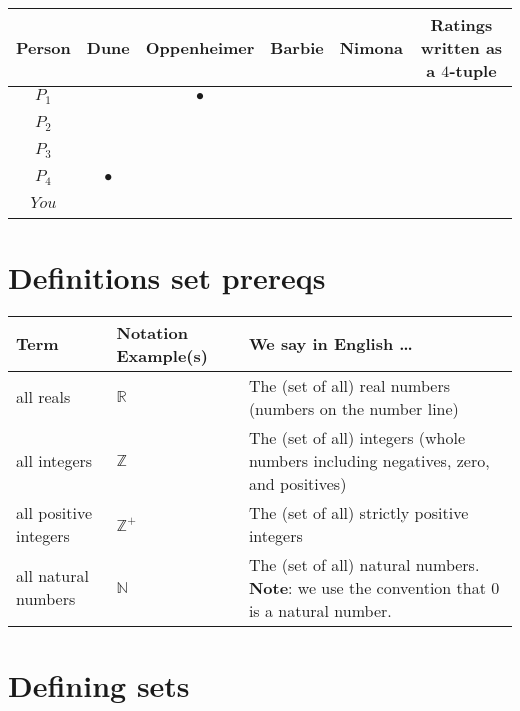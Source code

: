 \documentclass[12pt, oneside]{article}
\newcommand{\cmark}{\ding{51}}
\newcommand{\xmark}{\ding{55}}
\begin{document}
\vfill

\begin{center}
\begin{tabular}{c|cccc||c}
Person & Dune & Oppenheimer & Barbie & Nimona & Ratings written as a $4$-tuple\\
\hline
$P_1$     & \xmark & $\bullet$ & \cmark & \phantom{$(-1, 0, 1, 1)$} \\
&&&& \\
$P_2$     & \cmark & \cmark & \xmark & \phantom{$(1, 1, -1, 1)$} \\
&&&& \\
$P_3$     & \cmark & \cmark & \cmark & \phantom{$(1, 1, 1, 1)$} \\
&&&& \\
$P_4$     & $\bullet$ & \xmark & \cmark &  \\
&&&& \\
$You$     &  &  &  &  \\
&&&& \\
\end{tabular}
\end{center} \vfill
\section*{Definitions set prereqs}


\begin{center}
\begin{tabular}{|llp{9.8cm}|}
\hline
{\bf Term} & {\bf Notation Example(s)} & {\bf We say in English \ldots } \\
\hline
all reals & $\mathbb{R}$ & The (set of all) real numbers (numbers on the number line)\\
all integers & $\mathbb{Z}$ & The (set of all) integers (whole numbers including negatives, zero, and positives) \\
all positive integers & $\mathbb{Z}^+$ & The (set of all) strictly positive integers \\
all natural numbers & $\mathbb{N}$ & The (set of all) natural numbers. {\bf Note}: we use the convention that $0$ is a natural number. \\


\hline
\end{tabular}
\end{center} \vfill
\section*{Defining sets}
\end{document}
